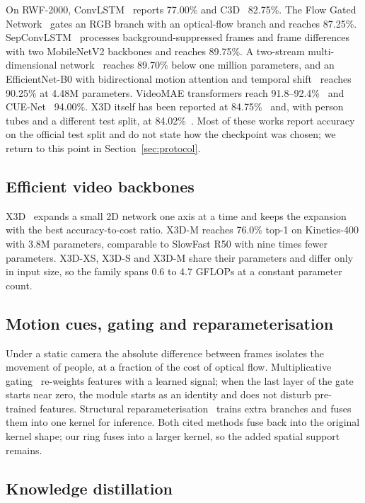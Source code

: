 \documentclass[conference]{IEEEtran}
\begin{document}
On RWF-2000, ConvLSTM~\cite{convlstm} reports 77.00\% and
C3D~\cite{c3d} 82.75\%. The Flow Gated Network~\cite{rwf2000} gates an RGB
branch with an optical-flow branch and reaches 87.25\%.
SepConvLSTM~\cite{sepconvlstm} processes background-suppressed frames and
frame differences with two MobileNetV2 backbones and reaches 89.75\%. A
two-stream multi-dimensional network~\cite{mdcn} reaches 89.70\% below one
million parameters, and an EfficientNet-B0 with bidirectional motion
attention and temporal shift~\cite{biltma} reaches 90.25\% at 4.48M
parameters. VideoMAE transformers reach 91.8--92.4\%~\cite{videomae,mixvit}
and CUE-Net~\cite{cuenet} 94.00\%. X3D itself has been reported at 84.75\%~\cite{cuenet} and,
with person tubes and a different test split, at 84.02\%~\cite{pathak2024}. Most of these works report accuracy on
the official test split and do not state how the checkpoint was chosen; we
return to this point in Section~\ref{sec:protocol}.

\subsection{Efficient video backbones}

X3D~\cite{x3d} expands a small 2D network one axis at a time and keeps the
expansion with the best accuracy-to-cost ratio. X3D-M reaches 76.0\% top-1
on Kinetics-400 with 3.8M parameters, comparable to SlowFast R50 with nine
times fewer parameters. X3D-XS, X3D-S and X3D-M share their parameters and
differ only in input size, so the family spans 0.6 to 4.7 GFLOPs at a
constant parameter count.

\subsection{Motion cues, gating and reparameterisation}

Under a static camera the absolute difference between frames isolates the
movement of people, at a fraction of the cost of optical flow.
Multiplicative gating~\cite{se,cbam} re-weights features with a learned
signal; when the last layer of the gate starts near zero, the module starts
as an identity and does not disturb pre-trained features. Structural
reparameterisation~\cite{repvgg,acnet} trains extra branches and fuses them
into one kernel for inference. Both cited methods fuse back into the
original kernel shape; our ring fuses into a larger kernel, so the added
spatial support remains.

\subsection{Knowledge distillation}
\end{document}
